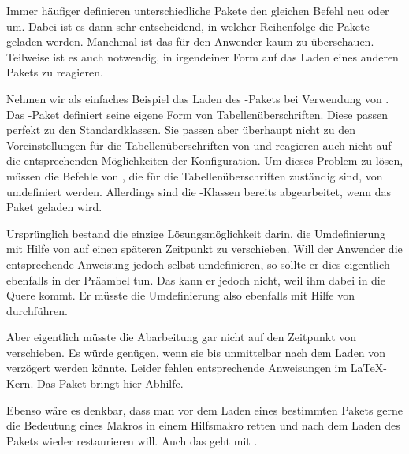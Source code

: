 Immer häufiger definieren unterschiedliche Pakete den
gleichen Befehl neu oder um. Dabei ist es dann sehr entscheidend, in welcher
Reihenfolge die Pakete geladen werden. Manchmal ist das für den Anwender kaum
zu überschauen. Teilweise ist es auch notwendig, in irgendeiner Form auf das
Laden eines anderen Pakets zu reagieren.

Nehmen wir als einfaches Beispiel das Laden des
-Pakets bei Verwendung von \KOMAScript{}. Das
-Paket definiert seine eigene Form von
Tabellenüberschriften. Diese passen perfekt zu den Standardklassen. Sie passen
aber überhaupt nicht zu den Voreinstellungen für die Tabellenüberschriften von
\KOMAScript{} und reagieren auch nicht auf die entsprechenden Möglichkeiten
der Konfiguration. Um dieses Problem zu lösen, müssen die Befehle von
, die für die Tabellenüberschriften zuständig sind, von
\KOMAScript{} umdefiniert werden. Allerdings sind die \KOMAScript{}-Klassen
bereits abgearbeitet, wenn das Paket geladen wird.

Ursprünglich bestand die einzige %
\iffalse%
Möglichkeit, dieses Problem zu lösen %
\else%
Lösungsmöglichkeit %
\fi%
darin, die Umdefinierung mit Hilfe von  auf einen
späteren Zeitpunkt zu verschieben. Will der Anwender die entsprechende
Anweisung jedoch selbst umdefinieren, so sollte er dies eigentlich ebenfalls
in der Präambel tun. Das kann er jedoch nicht, weil \KOMAScript{} ihm dabei in
die Quere kommt. Er müsste die Umdefinierung also ebenfalls mit Hilfe von
 durchführen.

Aber eigentlich müsste \KOMAScript{} die Abarbeitung gar
nicht auf den Zeitpunkt von  verschieben. Es
würde genügen, wenn sie bis unmittelbar nach dem Laden von 
verzögert werden könnte. Leider fehlen entsprechende Anweisungen im
\LaTeX-Kern. Das Paket  bringt hier Abhilfe.

Ebenso wäre es denkbar, dass man vor dem Laden
eines bestimmten Pakets gerne die Bedeutung eines Makros in einem Hilfsmakro
retten und nach dem Laden des Pakets wieder restaurieren will. Auch das geht
mit .

